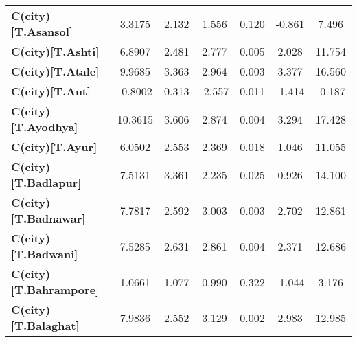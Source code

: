 \begin{center}
\begin{tabular}{lcccccc}
\textbf{C(city)[T.Asansol]}                                                                         &       3.3175  &        2.132     &     1.556  &         0.120        &       -0.861    &        7.496     \\
\textbf{C(city)[T.Ashti]}                                                                           &       6.8907  &        2.481     &     2.777  &         0.005        &        2.028    &       11.754     \\
\textbf{C(city)[T.Atale]}                                                                           &       9.9685  &        3.363     &     2.964  &         0.003        &        3.377    &       16.560     \\
\textbf{C(city)[T.Aut]}                                                                             &      -0.8002  &        0.313     &    -2.557  &         0.011        &       -1.414    &       -0.187     \\
\textbf{C(city)[T.Ayodhya]}                                                                         &      10.3615  &        3.606     &     2.874  &         0.004        &        3.294    &       17.428     \\
\textbf{C(city)[T.Ayur]}                                                                            &       6.0502  &        2.553     &     2.369  &         0.018        &        1.046    &       11.055     \\
\textbf{C(city)[T.Badlapur]}                                                                        &       7.5131  &        3.361     &     2.235  &         0.025        &        0.926    &       14.100     \\
\textbf{C(city)[T.Badnawar]}                                                                        &       7.7817  &        2.592     &     3.003  &         0.003        &        2.702    &       12.861     \\
\textbf{C(city)[T.Badwani]}                                                                         &       7.5285  &        2.631     &     2.861  &         0.004        &        2.371    &       12.686     \\
\textbf{C(city)[T.Bahrampore]}                                                                      &       1.0661  &        1.077     &     0.990  &         0.322        &       -1.044    &        3.176     \\
\textbf{C(city)[T.Balaghat]}                                                                        &       7.9836  &        2.552     &     3.129  &         0.002        &        2.983    &       12.985     \\

\end{tabular}
\end{center}
